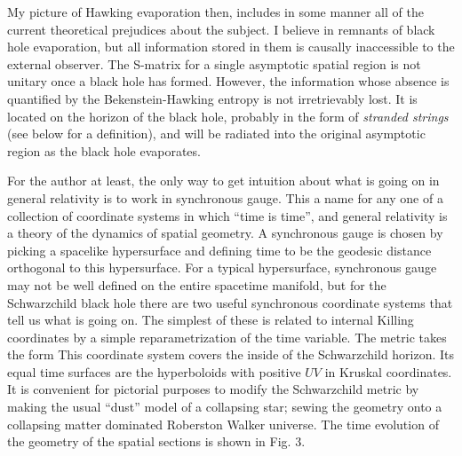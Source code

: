 My picture of Hawking evaporation then, includes in some manner all of
the current theoretical prejudices about the subject.  I believe in
remnants of black hole evaporation, but all information stored in them
is causally inaccessible to the external observer.  The S-matrix for a
single asymptotic spatial region is not unitary once a black hole has
formed. However, the information whose absence is quantified by the
Bekenstein-Hawking entropy is not irretrievably lost.  It is located on
the horizon of the black hole, probably in the form of {\it stranded
strings} (see below for a definition), and will be radiated into the
original asymptotic region as the black hole evaporates.


For the author at least, the only way to get intuition about what is going on
in general
relativity is to work in synchronous gauge.  This a name for any one of a
collection of coordinate systems in which ``time is time'', and general
relativity
is a theory of the dynamics of spatial geometry.  A synchronous gauge is chosen
by
picking a spacelike hypersurface and defining time to be the geodesic distance
orthogonal to this hypersurface.  For a typical hypersurface, synchronous gauge
may not be well defined on the entire spacetime manifold, but for the
Schwarzchild black hole there are two useful synchronous coordinate systems
that
tell us what is going on.  The simplest of these is related to internal Killing
coordinates by a simple reparametrization of the time variable.  The metric
takes the form
\eqn{}
\eqn{}
\eqn{}
\eqn{}
This coordinate system covers the inside of the Schwarzchild horizon.
Its equal time
surfaces are the hyperboloids with positive $UV$ in Kruskal coordinates.
  It is convenient for pictorial
purposes to modify the Schwarzchild metric by making the usual ``dust'' model
of
a collapsing star; sewing the geometry \killingmet onto a collapsing matter
dominated
Roberston Walker universe.  The time evolution of the geometry of the spatial
sections is shown in Fig. 3.

\ifig{}
{\epsfysize=6cm }


